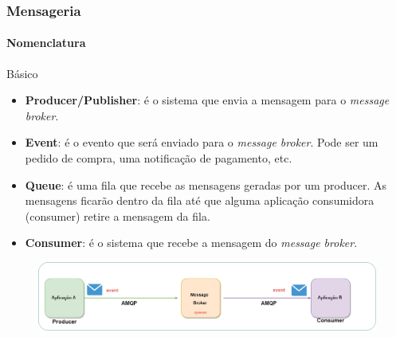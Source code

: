 \documentclass[
	9pt, %
	t, %
]{beamer}
\begin{document}
\begin{frame}
	\frametitle{Mensageria}
	\framesubtitle{Nomenclatura}

	\begin{block}{Básico}
		\begin{itemize}
			\item \textbf{Producer/Publisher}: é o sistema que envia a mensagem para o \textit{message broker}.
			\item \textbf{Event}: é o evento que será enviado para o \textit{message broker}. Pode ser um pedido de compra, uma notificação de pagamento, etc.
			\item \textbf{Queue}: é uma fila que recebe as mensagens geradas por um producer. As mensagens ficarão dentro da fila até que alguma aplicação consumidora (consumer) retire a mensagem da fila.
			\item \textbf{Consumer}: é o sistema que recebe a mensagem do \textit{message broker}.
		\end{itemize}
	\end{block}

	\begin{figure}
		\centering
		\includegraphics[width=0.9\linewidth]{Images/message_broker.png}
	\end{figure}

\end{frame}
\end{document}
